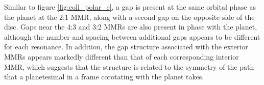 \documentclass[fleqn,usenatbib]{mnras}
\begin{document}
Similar to figure \ref{fig:coll_polar_e}, a gap is present at the same orbital phase as the planet at the 2:1 MMR, along with a second gap on
the opposite side of the disc. Gaps near the 4:3 and 3:2 MMRs are also present in phase with the planet, although the number and spacing between 
additional gaps appears to be different for each resonance. In addition, the gap structure associated with the exterior MMRs appears markedly
different than that of each corresponding interior MMR, which suggests that the structure is related to the symmetry of the path that a planetesimal
in a frame corotating with the planet takes.

\bsp	%
\label{lastpage}
\end{document}
